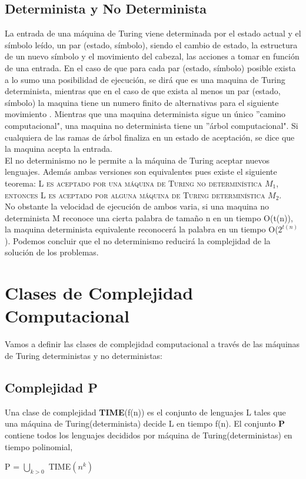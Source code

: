 \documentclass[12pt]{report}
\begin{document}
\subsection{Determinista y No Determinista}
La entrada de una máquina de Turing viene determinada por el estado actual y el símbolo leído, un par (estado, símbolo), siendo el cambio de estado, la estructura de un nuevo símbolo y el movimiento del cabezal, las acciones a tomar en función de una entrada. En el caso de que para cada par (estado, símbolo) posible exista a lo sumo una posibilidad de ejecución, se dirá que es una maquina de Turing determinista, mientras que en el caso de que exista al menos un par (estado, símbolo) la maquina tiene un numero finito de alternativas para el siguiente movimiento	. Mientras que una maquina determinista sigue un único ''camino computacional", una maquina no determinista tiene un ''árbol computacional". Si cualquiera de las ramas de árbol finaliza en un estado de aceptación, se dice que la maquina acepta la entrada.\\
El no determinismo no le permite a la máquina de Turing aceptar nuevos lenguajes. Además ambas versiones son equivalentes pues existe el siguiente teorema: \textsc{L es aceptado por una máquina de Turing no determinística $M_1$, entonces L es aceptado por alguna máquina de Turing determinística $M_2$}.\\
No obstante la velocidad de ejecución de ambos varia, si una maquina no determinista M reconoce una cierta palabra de tamaño n en un tiempo O(t(n)), la maquina determinista equivalente reconocerá la palabra en un tiempo O($2^{t(n)}$). Podemos concluir que el no determinismo reducirá la complejidad de la solución de los problemas.

\section{Clases de Complejidad Computacional}
Vamos a definir las clases de complejidad computacional a través de las máquinas de Turing deterministas y no deterministas:
\subsection{Complejidad P} 
Una clase de complejidad \textbf{TIME}(f(n)) es el conjunto de lenguajes L tales que una máquina de Turing(determinista) decide L en tiempo f(n).
El conjunto \textbf{P} contiene todos los lenguajes decididos por máquina de Turing(deterministas) en tiempo polinomial,\\
\begin{center}
P = $\bigcup_{k>0}$ TIME$(n^k)$
\end{center}
\end{document}
